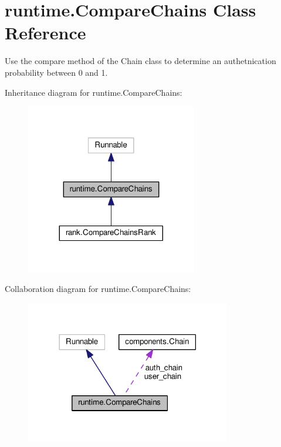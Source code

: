 \hypertarget{classruntime_1_1_compare_chains}{}\section{runtime.\+Compare\+Chains Class Reference}
\label{classruntime_1_1_compare_chains}


Use the compare method of the Chain class to determine an authetnication probability between 0 and 1.  




Inheritance diagram for runtime.\+Compare\+Chains\+:
\nopagebreak
\begin{figure}[H]
\begin{center}
\leavevmode
\includegraphics[width=212pt]{classruntime_1_1_compare_chains__inherit__graph}
\end{center}
\end{figure}


Collaboration diagram for runtime.\+Compare\+Chains\+:\nopagebreak
\begin{figure}[H]
\begin{center}
\leavevmode
\includegraphics[width=254pt]{classruntime_1_1_compare_chains__coll__graph}
\end{center}
\end{figure}
